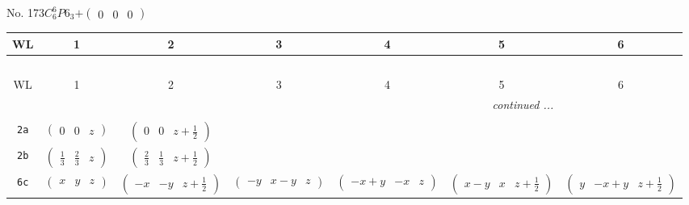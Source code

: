 \documentclass[fleqn,9pt,landscape]{jsarticle}
\begin{document}
\newpage
No. 173\quad$C_{6}^{6}$\quad$P6_3$\quad[ hexagonal ]\quad$+\begin{pmatrix} 0 & 0 & 0 \end{pmatrix}$
\begin{center}
\renewcommand{\arraystretch}{1.2}
\begin{longtable}{ccccccc}
 \hline \hline
WL & 1 & 2 & 3 & 4 & 5 & 6 \\ \hline \endfirsthead

\multicolumn{6}{l}{\tablename\ \thetable{}} \\
 \hline \hline
WL & 1 & 2 & 3 & 4 & 5 & 6 \\ \hline \endhead

 \hline \hline
\multicolumn{6}{r}{\footnotesize\it continued ...} \\ \endfoot

 \hline \hline
\multicolumn{6}{r}{} \\ \endlastfoot

{\tt 2a} & $ \begin{pmatrix} 0 & 0 & z \end{pmatrix} $ & $ \begin{pmatrix} 0 & 0 & z + \frac{1}{2} \end{pmatrix} $ & $  $ & $  $ & $  $ & $  $ \\ \hline
{\tt 2b} & $ \begin{pmatrix} \frac{1}{3} & \frac{2}{3} & z \end{pmatrix} $ & $ \begin{pmatrix} \frac{2}{3} & \frac{1}{3} & z + \frac{1}{2} \end{pmatrix} $ & $  $ & $  $ & $  $ & $  $ \\ \hline
{\tt 6c} & $ \begin{pmatrix} x & y & z \end{pmatrix} $ & $ \begin{pmatrix} - x & - y & z + \frac{1}{2} \end{pmatrix} $ & $ \begin{pmatrix} - y & x - y & z \end{pmatrix} $ & $ \begin{pmatrix} - x + y & - x & z \end{pmatrix} $ & $ \begin{pmatrix} x - y & x & z + \frac{1}{2} \end{pmatrix} $ & $ \begin{pmatrix} y & - x + y & z + \frac{1}{2} \end{pmatrix} $ \\
\end{longtable}
\end{center}
\end{document}
